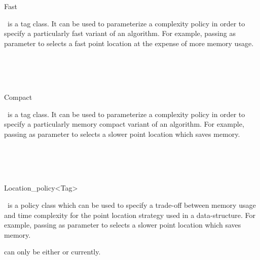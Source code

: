 \begin{ccRefClass}{Fast}

\ccDefinition
\ccRefName\ is a tag class.  It can be used to parameterize a complexity policy
in order to specify a particularly fast variant of an algorithm.
For example, passing  as parameter to
 selects a fast point location at the expense of
more memory usage.


\ccIsModel
{}

\ccSeeAlso
{} \\
 \\
 \\

\end{ccRefClass} 


\begin{ccRefClass}{Compact}

\ccDefinition
\ccRefName\ is a tag class.  It can be used to parameterize a complexity policy
in order to specify a particularly memory compact variant of an algorithm.
For example, passing  as parameter to
 selects a slower point location which saves memory.


\ccIsModel
{}

\ccSeeAlso
{} \\
 \\
 \\

\end{ccRefClass} 


\begin{ccRefClass}{Location_policy<Tag>}

\ccDefinition
\ccRefName\ is a policy class which can be used to specify a trade-off
between memory usage and time complexity for the point location strategy
used in a data-structure.
For example, passing  as parameter to
 selects a slower point location which saves memory.


\ccParameters

 can only be either  or  currently.

\ccIsModel
{}

\ccSeeAlso
{} \\
 \\
 \\

\end{ccRefClass} 


